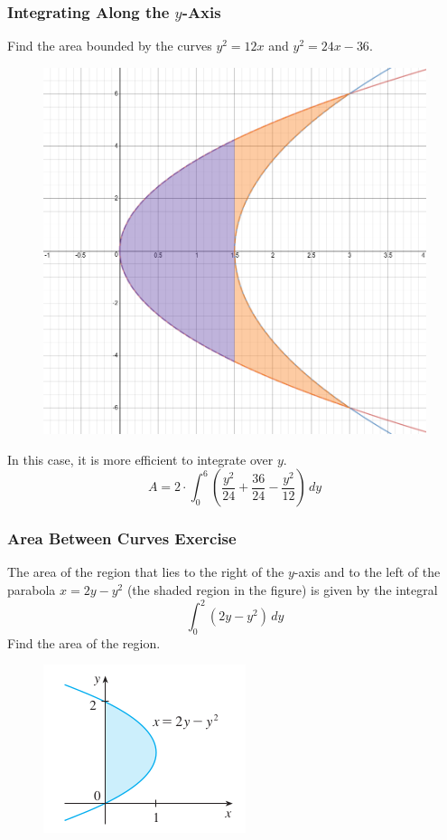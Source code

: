 \documentclass[xcolor=dvipsnames]{beamer}
\begin{document}
\begin{frame}
  \frametitle{Integrating Along the $y$-Axis}
  Find the area bounded by the curves $y^{2}=12x$ and $y^{2}=24x-36$.
\begin{figure}[h]
\includegraphics[scale=.15]{./diagrams/AreaBetweenTwoCurves.png}
\end{figure}
In this case, it is more efficient to integrate over $y$.
\begin{equation}
  \label{eq:nuabianu}
  A=2\cdot\int_{0}^{6}\left(\frac{y^{2}}{24}+\frac{36}{24}-\frac{y^{2}}{12}\right)\,dy
\end{equation}
\end{frame}

\begin{frame}
  \frametitle{Area Between Curves Exercise}
  {\ubung} The area of the region that lies to the right of the
  $y$-axis and to the left of the parabola $x=2y-y^{2}$ (the shaded
  region in the figure) is given by the integral 
  \begin{equation}
    \label{eq:ooghoosh}
    \int_{0}^{2}(2y-y^{2})\,dy
  \end{equation}
  Find the area of the region.
  \begin{figure}[h]
    \includegraphics[scale=0.5]{./diagrams/areacurves.png}
  \end{figure}
\end{frame}
\end{document}
